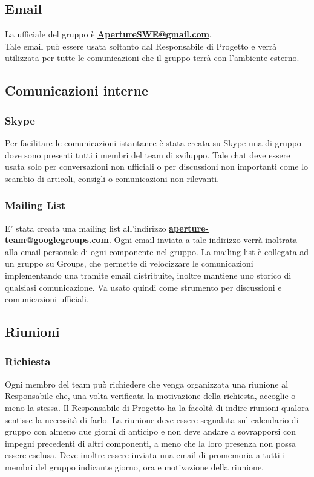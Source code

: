 \subsection{Email}
\label{3.1}
La  ufficiale del gruppo è \textbf{\url{ApertureSWE@gmail.com}}.\\
Tale email può essere usata soltanto dal Responsabile di Progetto e verrà utilizzata per tutte le comunicazioni che il gruppo terrà con l'ambiente esterno.

\subsection{Comunicazioni interne}
\label{3.2}

\subsubsection{Skype}
\label{3.2.1}
Per facilitare le comunicazioni istantanee è stata creata su Skype una  di gruppo dove sono presenti tutti i membri del team di sviluppo. Tale chat deve essere usata solo per conversazioni non ufficiali o per discussioni non importanti come lo scambio di articoli, consigli o comunicazioni non rilevanti.

\subsubsection{Mailing List}
\label{3.2.2}
E' stata creata una mailing list all'indirizzo \textbf{\url{aperture-team@googlegroups.com}}.
Ogni email inviata a tale indirizzo verrà inoltrata alla email personale di ogni componente nel gruppo.
La mailing list è collegata ad un gruppo su  Groups, che permette di velocizzare le comunicazioni implementando una  tramite email distribuite, inoltre mantiene uno storico di qualsiasi comunicazione. Va usato quindi come strumento per discussioni e comunicazioni ufficiali.

\subsection{Riunioni}
\label{3.3}

\subsubsection{Richiesta}
\label{3.3.1}
Ogni membro del team può richiedere che venga organizzata una riunione al Responsabile che, una volta verificata la motivazione della richiesta, accoglie o meno la stessa.
Il Responsabile di Progetto ha la facoltà di indire riunioni qualora sentisse la necessità di farlo.
La riunione deve essere segnalata sul calendario di gruppo con almeno due giorni di anticipo e non deve andare a sovrapporsi con impegni precedenti di altri componenti, a meno che la loro presenza non possa essere esclusa. Deve inoltre essere inviata una email di promemoria a tutti i membri del gruppo indicante giorno, ora e motivazione della riunione.

